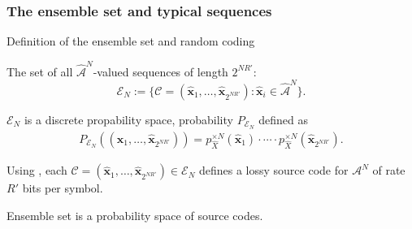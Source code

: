 \subsubsection{The ensemble set and typical sequences}
\begin{frame}{Definition of the ensemble set and random coding}
\bit
\item The set of all $\hat{\mathcal{A}}^N$-valued sequences of length $2^{NR'}$: 
\[
\mathcal{E}_N:=\{\mathcal{C}=({\hat{\mathbf{x}}}_1,\dots,{\hat{\mathbf{x}}}_{2^{NR'}})\colon {\hat{\mathbf{x}}}_i\in{\hat{\mathcal{A}}}^N\}.
\]
\item $\mathcal{E}_N$ is a discrete propability space, probability $P_{\mathcal{E}_N}$ defined as
\begin{align}\label{ProbEnsemble}
P_{\mathcal{E}_N}(({\hat{\mathbf{x}}}_1,\dots,{\hat{\mathbf{x}}}_{2^{NR'}}))=p_{\hat{X}}^{\times N}({\hat{\mathbf{x}}}_1)\cdot \cdots \cdot p_{\hat{X}}^{\times N}({\hat{\mathbf{x}}}_{2^{NR'}}).
\end{align}
\item Using , each $\mathcal{C}=({\hat{\mathbf{x}}}_1,\dots,{\hat{\mathbf{x}}}_{2^{NR'}})\in\mathcal{E}_N$ defines a lossy source code for $\mathcal{A}^N$ of rate $R'$ bits per symbol.  
\item[\iarrow]  Ensemble set is a probability space of source codes. 
\eit

\end{frame}


